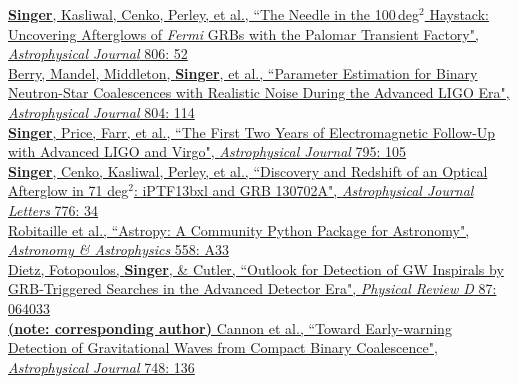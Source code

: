 \documentclass[10pt, letterpaper]{article} %
\newcommand{\years}[1]{\marginnote{\scriptsize #1}} %
\begin{document}
%
\years{2015}\href{http://dx.doi.org/10.1088/0004-637X/806/1/52}{\textbf{Singer}, Kasliwal, Cenko, Perley, et al., “The Needle in the 100\,deg$^2$ Haystack: Uncovering Afterglows of \emph{Fermi} GRBs with the Palomar Transient Factory", \emph{Astrophysical Journal} 806: 52}\\[0.125cm]
%
\years{2015}\href{http://dx.doi.org/10.1088/0004-637X/804/2/114}{Berry, Mandel, Middleton, \textbf{Singer}, et al., “Parameter Estimation for Binary Neutron-Star Coalescences with Realistic Noise During the Advanced LIGO Era", \emph{Astrophysical Journal} 804: 114}\\[0.125cm]
%
\years{2014}\href{http://dx.doi.org/10.1088/0004-637X/795/2/105}{\textbf{Singer}, Price, Farr, et al., “The First Two Years of Electromagnetic Follow-Up with Advanced LIGO and Virgo", \emph{Astrophysical Journal} 795: 105}\\[0.125cm]
%
\years{2013}\href{http://dx.doi.org/10.1088/2041-8205/776/2/L34}{\textbf{Singer}, Cenko, Kasliwal, Perley, et al., “Discovery and Redshift of an Optical Afterglow in 71 deg$^2$: iPTF13bxl and GRB 130702A", \emph{Astrophysical Journal Letters} 776: 34}\\[0.125cm]
%
\years{2013}\href{http://dx.doi.org/10.1051/0004-6361/201322068}{Robitaille et al., “Astropy: A Community Python Package for Astronomy", \emph{Astronomy \& Astrophysics} 558: A33}\\[0.125cm]
%
\years{2013}\href{http://dx.doi.org/10.1103/PhysRevD.87.064033}{Dietz, Fotopoulos, \textbf{Singer}, \& Cutler, “Outlook for Detection of GW Inspirals by GRB-Triggered Searches in the Advanced Detector Era", \emph{Physical Review D} 87: 064033}\\[0.125cm]
%
\years{2012}\href{http://dx.doi.org/10.1088/0004-637X/748/2/136}{\textbf{(note: corresponding author)} Cannon et al., “Toward Early-warning Detection of Gravitational Waves from Compact Binary Coalescence", \emph{Astrophysical Journal} 748: 136}\\
\end{document}
